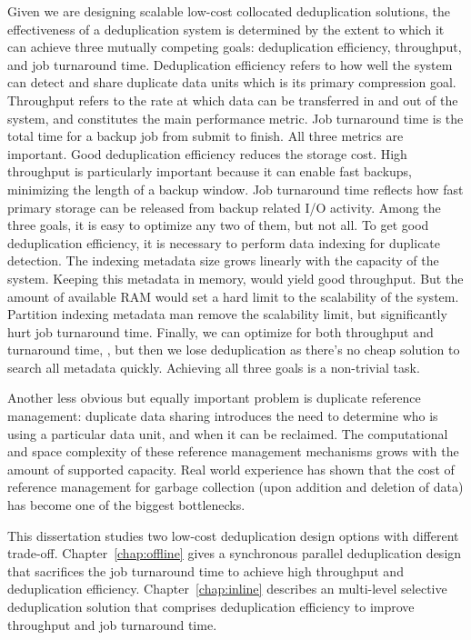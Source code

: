 Given we are designing scalable low-cost collocated deduplication solutions,
the effectiveness of a deduplication system is determined
by the extent to which it can achieve three mutually competing goals:
deduplication efficiency, throughput, and job turnaround time.
Deduplication efficiency refers to
how well the system can detect and share duplicate data
units which is its primary compression goal. Throughput refers
to the rate at which data can be transferred in and out of
the system, and constitutes the main performance metric.
Job turnaround time is the total time for a backup job from submit to finish.
All three metrics are important. Good deduplication efficiency
reduces the storage cost. High throughput
is particularly important because it can enable fast backups,
minimizing the length of a backup window.
Job turnaround time reflects how fast primary storage
can be released from backup related I/O activity.
Among the three goals, it is easy to optimize any two of them,
but not all. To get good deduplication efficiency,
it is necessary to perform data indexing for duplicate detection.
The indexing metadata size grows linearly with the capacity of the system.
Keeping this metadata in memory,
would yield good throughput.
But the amount of available RAM would set a hard limit to the scalability of the
system. Partition indexing metadata man remove
the scalability limit, but significantly hurt job turnaround time.
Finally, we can optimize for both throughput and turnaround time,
, but then we lose deduplication as there's no cheap solution to search all metadata quickly.
Achieving all three goals is a non-trivial task.

Another less obvious but equally important problem is
duplicate reference management: duplicate data sharing
introduces the need to determine who is using a particular data unit, and when it can be reclaimed.
The computational and space complexity of these reference management mechanisms grows
with the amount of supported capacity. Real world experience has shown that the
cost of reference management for garbage collection (upon addition and deletion of data)
has become one of the biggest
bottlenecks.

This dissertation studies two low-cost deduplication design options with different trade-off.
Chapter~\ref{chap:offline} gives a synchronous parallel deduplication design that
sacrifices the job turnaround time to achieve high throughput and deduplication efficiency.
Chapter~\ref{chap:inline} describes an multi-level selective deduplication solution
that comprises deduplication efficiency to improve throughput and job turnaround time.

